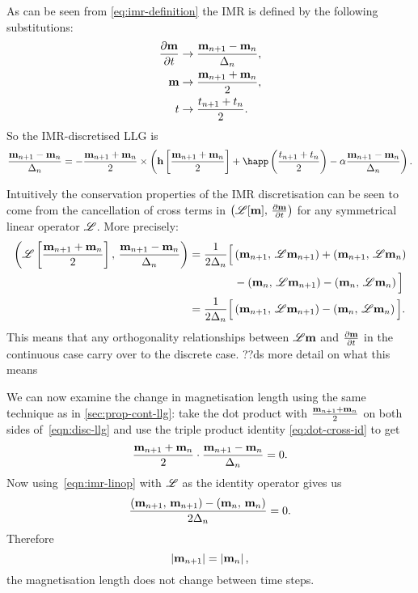 As can be seen from \cref{eq:imr-definition} the IMR is defined by the following substitutions:
\begin{equation}
\begin{aligned}
  \label{eq:55}
  \frac{\partial \mathbf{m}}{\partial t} &\rightarrow \frac{\mathbf{m}_{n+1} - \mathbf{m}_n}{\Delta_{n}}, \\
  \mathbf{m} &\rightarrow \frac{\mathbf{m}_{n+1} + \mathbf{m}_n}{2}, \\
  t &\rightarrow \frac{t_{n+1} + t_n}{2}.
\end{aligned}
\end{equation}
So the IMR-discretised LLG is
\begin{equation}
  \frac{\mv_{n+1} - \mv_n}{\dtn} = - \frac{\mv_{n+1} + \mv_n}{2} \times
  \left(
    \hv \left[\frac{\mv_{n+1} + \mv_n}{2} \right]
    + \happ\left(\frac{t_{n+1} + t_n}{2}\right)
    - \dampc \frac{\mv_{n+1} - \mv_n}{\dtn}
  \right).
  \label{eqn:disc-llg}
\end{equation}

Intuitively the conservation properties of the IMR discretisation can be seen to come from the cancellation of cross terms in $\left(\mathscr{L}[\mathbf{m}],\, \frac{\partial \mathbf{m}}{\partial t} \right)$ for any symmetrical linear operator $\mathscr{L}$.
More precisely:
\begin{equation}
  \begin{aligned}
    \label{eqn:imr-linop}
    \left(\mathscr{L} \left[ \frac{\mathbf{m}_{n+1} + \mathbf{m}_n}{2} \right],\,  \frac{\mathbf{m}_{n+1} - \mathbf{m}_n}{\Delta_{n}}  \right)
    &= \frac{1}{2\Delta_{n}} \Big[
    \left(\mathbf{m}_{n+1},\, \mathscr{L} \mathbf{m}_{n+1} \right) + \left(\mathbf{m}_{n+1},\, \mathscr{L} \mathbf{m}_{n} \right) \\
    & \qquad\qquad - \left(\mathbf{m}_{n},\, \mathscr{L} \mathbf{m}_{n+1} \right) - \left(\mathbf{m}_{n},\, \mathscr{L} \mathbf{m}_{n} \right)
    \Big] \\
    &= \frac{1}{2\Delta_{n}} \Big[
    \left(\mathbf{m}_{n+1},\, \mathscr{L} \mathbf{m}_{n+1} \right)
    - \left(\mathbf{m}_{n},\, \mathscr{L} \mathbf{m}_{n} \right)
    \Big].
  \end{aligned}
\end{equation}
This means that any orthogonality relationships between $\mathscr{L} \mathbf{m}$ and $\frac{\partial \mathbf{m}}{\partial t}$ in the continuous case carry over to the discrete case. ??ds more detail on what this means

We can now examine the change in magnetisation length using the same technique as in \cref{sec:prop-cont-llg}: take the dot product with $\frac{\mathbf{m}_{n+1} + \mathbf{m}_n}{2}$ on both sides of~\cref{eqn:disc-llg} and use the triple product identity \cref{eq:dot-cross-id} to get
\begin{equation}
  \label{eq:63}
  \frac{\mathbf{m}_{n+1} + \mathbf{m}_n}{2} \cdot \frac{\mathbf{m}_{n+1} - \mathbf{m}_n}{\Delta_{n}} = 0.
\end{equation}
Now using~\cref{eqn:imr-linop} with $\mathscr{L}$ as the identity operator gives us
\begin{equation}
  \frac{\left(\mathbf{m}_{n+1},\, \mathbf{m}_{n+1} \right) - \left(\mathbf{m}_n,\, \mathbf{m}_n \right) }{2 \Delta_{n}} = 0.
\end{equation}
Therefore
\begin{equation}
  \left|{\mathbf{m}_{n+1}} \right| = \left|{\mathbf{m}_n} \right|,
\end{equation}
\ie the magnetisation length does not change between time steps.


